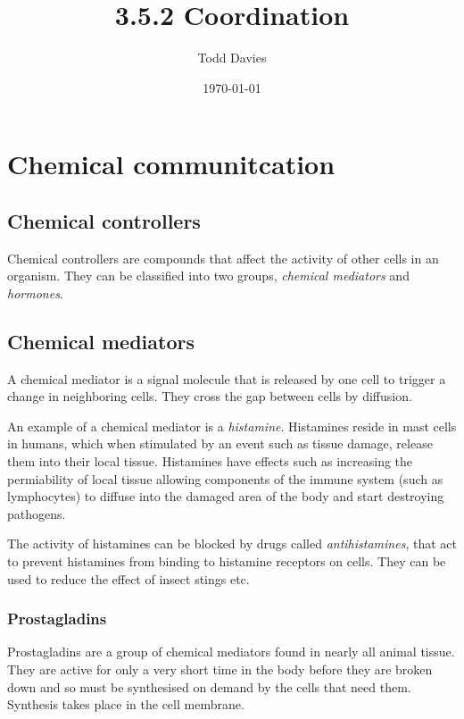 \documentclass{article}
\title{3.5.2 Coordination}
\author{Todd Davies}
\date{\today}
\begin{document}
\lhead{\today}

\maketitle

\section*{Chemical communitcation}
\thispagestyle{empty}

\subsection*{Chemical controllers}

Chemical controllers are compounds that affect the activity of other cells in an
organism. They can be classified into two groups, {\it chemical mediators} and
{\it hormones}.

\subsection*{Chemical mediators}

A chemical mediator is a signal molecule that is released by one cell to trigger
a change in neighboring cells. They cross the gap between cells by diffusion.

An example of a chemical mediator is a {\it histamine}. Histamines reside in
mast cells in humans, which when stimulated by an event such as tissue damage,
release them into their local tissue. Histamines have effects such as increasing
the permiability of local tissue allowing components of the immune system (such
as lymphocytes) to diffuse into the damaged area of the body and start
destroying pathogens.

The activity of histamines can be blocked by drugs called {\it antihistamines},
that act to prevent histamines from binding to histamine receptors on cells.
They can be used to reduce the effect of insect stings etc.

\subsubsection*{Prostagladins}

Prostagladins are a group of chemical mediators found in nearly all animal
tissue. They are active for only a very short time in the body before they are
broken down and so must be synthesised on demand by the cells that need them.
Synthesis takes place in the cell membrane.
\end{document}

